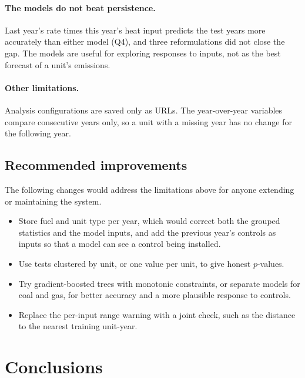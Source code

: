 \documentclass[11pt,a4paper]{article}
\begin{document}
\paragraph{The models do not beat persistence.} Last year's \NOx{} rate times this year's heat
input predicts the test years more accurately than either model (Q4), and three reformulations
did not close the gap. The models are useful for exploring responses to inputs, not as the best
forecast of a unit's emissions.

\paragraph{Other limitations.} Analysis configurations are saved only as URLs. The year-over-year
variables compare consecutive years only, so a unit with a missing year has no change for the
following year.

\subsection{Recommended improvements}

The following changes would address the limitations above for anyone extending or maintaining
the system.
\begin{itemize}[itemsep=2pt]
  \item Store fuel and unit type per year, which would correct both the grouped statistics and the
        model inputs, and add the previous year's controls as inputs so that a model can see a
        control being installed.
  \item Use tests clustered by unit, or one value per unit, to give honest $p$-values.
  \item Try gradient-boosted trees with monotonic constraints, or separate models for coal and gas,
        for better accuracy and a more plausible response to controls.
  \item Replace the per-input range warning with a joint check, such as the distance to the
        nearest training unit-year.
\end{itemize}

\section{Conclusions}
\label{sec:conclusions}
\end{document}
